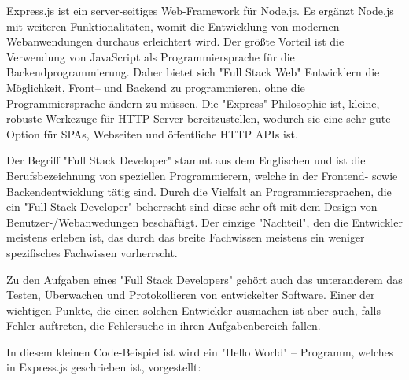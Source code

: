 
Express.js ist ein server-seitiges Web-Framework für Node.js. Es ergänzt Node.js mit weiteren Funktionalitäten, womit die Entwicklung von modernen Webanwendungen durchaus erleichtert wird. Der größte Vorteil ist die Verwendung von JavaScript als Programmiersprache für die Backendprogrammierung. Daher bietet sich "Full Stack Web" Entwicklern die Möglichkeit, Front– und Backend zu programmieren, ohne die Programmiersprache ändern zu müssen. Die "Express" Philosophie ist, kleine, robuste Werkezuge für HTTP Server bereitzustellen, wodurch sie eine sehr gute Option für SPAs, Webseiten und öffentliche HTTP APIs ist. \cite{Express}

Der Begriff "Full Stack Developer" stammt aus dem Englischen und ist die Berufsbezeichnung von speziellen Programmierern, welche in der Frontend- sowie Backendentwicklung tätig sind. Durch die Vielfalt an Programmiersprachen, die ein "Full Stack Developer" beherrscht sind diese sehr oft mit dem Design von Benutzer-/Webanwedungen beschäftigt. Der einzige "Nachteil", den die Entwickler meistens erleben ist, das durch das breite Fachwissen meistens ein weniger spezifisches Fachwissen vorherrscht. 

Zu den Aufgaben eines "Full Stack Developers" gehört auch das unteranderem das Testen, Überwachen und Protokollieren von entwickelter Software. Einer der wichtigen Punkte, die einen solchen Entwickler ausmachen ist aber auch, falls Fehler auftreten, die Fehlersuche in ihren Aufgabenbereich fallen. \cite{FullStack}

\pagebreak
{}

In diesem kleinen Code-Beispiel ist wird ein "Hello World" – Programm, welches in Express.js geschrieben ist, vorgestellt:


\cite{Express}


